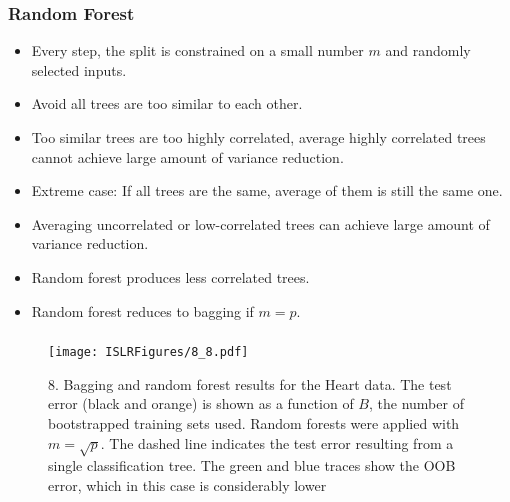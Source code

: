 \documentclass{beamer}
\begin{document}
                      \begin{frame}
                      	\frametitle{Random Forest  }
                      	\begin{itemize}
                      		\item Every step, the split is constrained on a small number $m$ and randomly 
                      		selected inputs. 
                      		\item  Avoid all trees are too similar to each other. 
                      		\item  Too similar trees are too highly correlated, average highly correlated  trees
                      		cannot achieve large amount of variance reduction.
                      		\item  Extreme case: If all trees are the same, average of them is still the same one.
                      		\item Averaging uncorrelated or low-correlated trees can achieve large amount of variance reduction.
                      		\item Random forest  produces less correlated trees.
                      		\item Random forest reduces to bagging if $m=p$.
                      		
                      		
                      	\end{itemize}
                      \end{frame} 
 
                  \begin{frame}
                 	\frametitle{ }
                 	\begin{figure}
                 		\centering
                 		
                 		\centering
                 		\texttt{[image: ISLRFigures/8\_8.pdf]}
                 		\caption{\scriptsize 8. Bagging and random forest results for the Heart data. The test
                 			error (black and orange) is shown as a function of $B$, the number of bootstrapped
                 			training sets used. Random forests were applied with $m = \sqrt{p}$.  The dashed line
                 			indicates the test error resulting from a single classification tree. The green and
                 			blue traces show the OOB error, which in this case is considerably lower
                 		}
                 	\end{figure}
                 \end{frame}
                  
\end{document}
